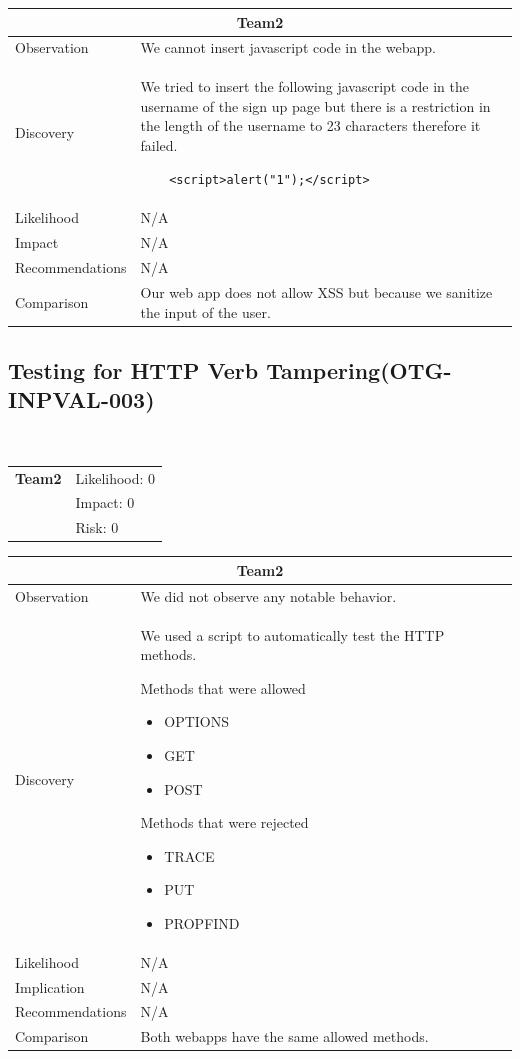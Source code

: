 \documentclass[headsepline,footsepline,footinclude=false,oneside,fontsize=11pt,paper=a4,listof=totoc,bibliography=totoc]{scrbook} %
\begin{document}
\begin{tabular}{ l|p{11cm}  }
	\hline
	\multicolumn{2}{c}{\textbf{Team2}} \\
	\hline
	Observation   &  We cannot insert javascript code in the webapp. \\
	Discovery  & We tried to insert the following javascript code in the username of the sign up page but there is a restriction in the length of the username to 23 characters therefore it failed.
	\begin{lstlisting}
	<script>alert("1");</script>
	\end{lstlisting} \\
	Likelihood & N/A \\
	Impact    & N/A \\
	Recommendations & N/A \\
	Comparison & Our web app does not allow XSS but because we sanitize the input of the user.\\
	\hline
\end{tabular}

 
\pagebreak
\subsection{Testing for HTTP Verb Tampering(OTG-INPVAL-003)}\


\begin{tabular}{cR{12cm}}
	\textbf{Team2} & Likelihood: 0\\& Impact: 0\\& Risk: 0
\end{tabular}

\begin{tabular}{ l|p{11cm}  }
	\hline
	\multicolumn{2}{c}{\textbf{Team2}} \\
	\hline
	Observation   &  We did not observe any notable behavior.  \\
	Discovery  &  We used a script to automatically test the HTTP methods.\

	Methods that were allowed\

	\begin{itemize} 
		\item OPTIONS
		\item GET
		\item POST 
	\end{itemize}

	Methods that were rejected\

	\begin{itemize}
		\item TRACE
		\item PUT
		\item PROPFIND
	\end{itemize} \\

	Likelihood & N/A \\
	Implication    & N/A \\
	Recommendations & N/A \\
	Comparison &  Both webapps have the same allowed methods.\\
	\hline
\end{tabular}
\end{document}
